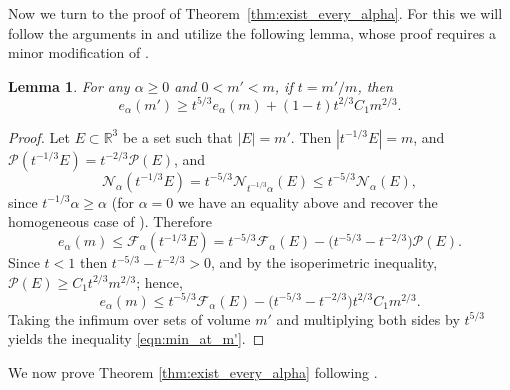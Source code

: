 \documentclass[a4paper,11pt,reqno]{amsart}
\numberwithin{equation}{section}
\newtheorem{lemma}[theorem]{Lemma}
\theoremstyle{remark}
\theoremstyle{definition}
\newcommand{\R}{\mathbb R}
\newcommand{\enf}{\mathcal{F}_{\alpha}}
\newcommand{\nl}{\mathcal{N}_{\alpha}}
\renewcommand{\leq}{\leqslant}
\renewcommand{\geq}{\geqslant}
\newcommand{\calN}{\mathcal{N}}
\newcommand{\Pe}{\mathcal{P}}
\begin{document}
Now we turn to the proof of Theorem~\ref{thm:exist_every_alpha}. For this we will follow the arguments in \cite{FN} and utilize the following lemma, whose proof requires a minor modification of \cite[Lemma 5]{FN}.

	\begin{lemma}
		For any $\alpha\geq 0$ and $0<m'<m$, if $t=m'/m$, then
			\begin{equation}\label{eqn:min_at_m'}
				e_\alpha(m') \geq t^{5/3}e_\alpha(m) + (1-t)t^{2/3}C_1 m^{2/3}.
			\end{equation}
	\end{lemma}
	
\begin{proof}
Let $E\subset\R^3$ be a set such that $|E|=m'$. Then $|t^{-1/3}E|=m$, and $\Pe(t^{-1/3}E)=t^{-2/3}\Pe(E)$, and
	\[
		\nl(t^{-1/3}E)=t^{-5/3}\calN_{t^{-1/3}\alpha}(E) \leq t^{-5/3}\nl(E),
	\]
since $t^{-1/3}\alpha\geq \alpha$ (for $\alpha=0$ we have an equality above and recover the homogeneous case of \cite{FN}). Therefore
	\[
		e_\alpha(m) \leq \enf(t^{-1/3}E) = t^{-5/3}\enf(E) - \big(t^{-5/3}-t^{-2/3}\big)\Pe(E).
	\]
Since $t<1$ then $t^{-5/3}-t^{-2/3}>0$, and by the isoperimetric inequality, $\Pe(E)\geq C_1 t^{2/3}m^{2/3}$; hence,
	\[
		e_\alpha(m) \leq t^{-5/3}\enf(E) - \big(t^{-5/3}-t^{-2/3}\big)t^{2/3} C_1 m^{2/3}.
	\]
Taking the infimum over sets of volume $m'$ and multiplying both sides by $t^{5/3}$ yields the inequality \eqref{eqn:min_at_m'}.
\end{proof}

We now prove Theorem \ref{thm:exist_every_alpha} following \cite[Theorem 4]{FN}.
\end{document}

